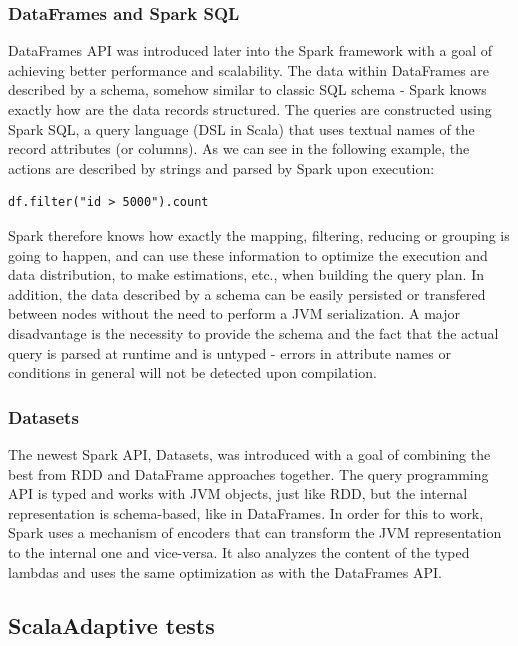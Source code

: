 \subsubsection{DataFrames and Spark SQL}

DataFrames API was introduced later into the Spark framework with a goal of achieving better performance and scalability. The data within DataFrames are described by a schema, somehow similar to classic SQL schema - Spark knows exactly how are the data records structured. The queries are constructed using Spark SQL, a query language (DSL in Scala) that uses textual names of the record attributes (or columns). As we can see in the following example, the actions are described by strings and parsed by Spark upon execution:

\lstset{style=Scala}
\begin{lstlisting}
df.filter("id > 5000").count
\end{lstlisting}

Spark therefore knows how exactly the mapping, filtering, reducing or grouping is going to happen, and can use these information to optimize the execution and data distribution, to make estimations, etc., when building the query plan. In addition, the data described by a schema can be easily persisted or transfered between nodes without the need to perform a JVM serialization. A major disadvantage is the necessity to provide the schema and the fact that the actual query is parsed at runtime and is untyped - errors in attribute names or conditions in general will not be detected upon compilation.

\subsubsection{Datasets}

The newest Spark API, Datasets, was introduced with a goal of combining the best from RDD and DataFrame approaches together. The query programming API is typed and works with JVM objects, just like RDD, but the internal representation is schema-based, like in DataFrames. In order for this to work, Spark uses a mechanism of encoders that can transform the JVM representation to the internal one and vice-versa. It also analyzes the content of the typed lambdas and uses the same optimization as with the DataFrames API.

\subsection{ScalaAdaptive tests}

